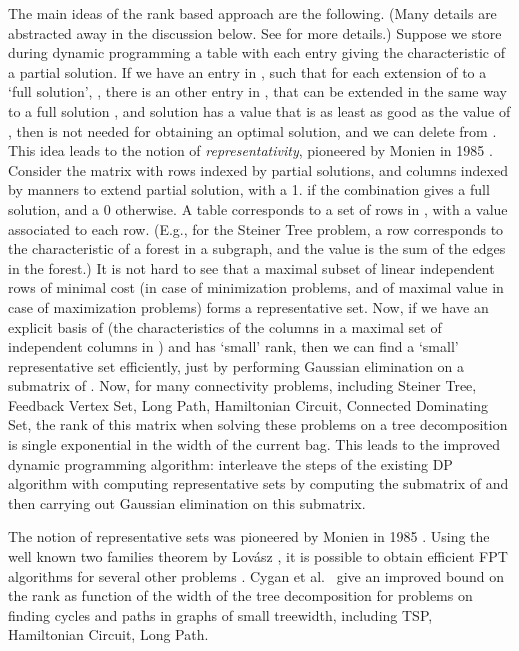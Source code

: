 \documentclass{llncs}
\begin{document}
The main ideas of the rank based approach are the following. (Many
details are abstracted away in the discussion below. See \cite{BodlaenderCKN12}
for more details.)
Suppose
we store during dynamic programming a table  with each entry giving
the characteristic of a partial solution. If we have an entry  in ,
such that for each extension of  to a `full solution', , there
is an other entry in , that can be extended in the same way to a full solution
, and solution  has a value that is as least as good as the
value of , then  is not needed for obtaining an optimal solution,
and we can delete  from . This idea leads to the notion of
{\em representativity}, pioneered by Monien in 1985 \cite{Monien85}.
Consider the matrix  with rows indexed by partial solutions, and
columns indexed by manners to extend partial solution, with a 1.
if the combination gives a full solution, and a 0 otherwise.
A table  corresponds to a set of rows in , with a value
associated to each row. (E.g., for the {\sc Steiner Tree} problem,
a row corresponds to the characteristic of a forest in a subgraph,
and the value is the sum of the edges in the forest.)
It is not hard to see that a maximal subset of linear independent rows of minimal cost
(in case of minimization problems, and of maximal value in case of
maximization problems) forms a representative set. 
Now, if we have an explicit basis of  (the characteristics of the
columns in a maximal set of independent columns in )
and  has `small' rank, then we can find a `small' representative
set efficiently, just by performing Gaussian elimination on a submatrix of .
Now, for many connectivity problems, including {\sc Steiner Tree},
{\sc Feedback Vertex Set}, {\sc Long Path}, {\sc Hamiltonian Circuit},
{\sc Connected Dominating Set}, the rank of this matrix  when
solving these problems on a tree decomposition is single exponential
in the width of the current bag. This leads to the improved dynamic
programming algorithm: interleave the steps of the existing DP algorithm
with computing representative sets by computing the submatrix of 
and then carrying out Gaussian elimination on this submatrix.

The notion of representative sets was pioneered by Monien in 1985
\cite{Monien85}. Using the well known two families theorem by Lov\'{a}sz \cite{Lovasz77},
it is possible to obtain efficient FPT algorithms for several other
problems \cite{Marx09,FominLS13}. Cygan et al.~\cite{CyganKN12}
give an improved bound on the rank as function of the width of
the tree decomposition for problems on finding cycles and paths
in graphs of small treewidth, including {\sc TSP}, {\sc Hamiltonian Circuit},
{\sc Long Path}.
\end{document}
